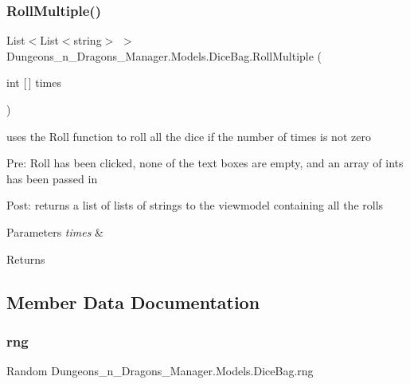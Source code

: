 \subsubsection{\texorpdfstring{Roll\+Multiple()}{RollMultiple()}}
{\footnotesize\ttfamily List$<$List$<$string$>$ $>$ Dungeons\+\_\+n\+\_\+\+Dragons\+\_\+\+Manager.\+Models.\+Dice\+Bag.\+Roll\+Multiple (\begin{DoxyParamCaption}\item[{int \mbox{[}$\,$\mbox{]}}]{times }\end{DoxyParamCaption})\hspace{0.3cm}{\ttfamily [inline]}}



uses the Roll function to roll all the dice if the number of times is not zero 

Pre\+: Roll has been clicked, none of the text boxes are empty, and an array of ints has been passed in

Post\+: returns a list of lists of strings to the viewmodel containing all the rolls 


\begin{DoxyParams}{Parameters}
{\em times} & \\
\hline
\end{DoxyParams}
\begin{DoxyReturn}{Returns}

\end{DoxyReturn}


\subsection{Member Data Documentation}
\mbox{\label{class_dungeons__n___dragons___manager_1_1_models_1_1_dice_bag_a5932c409a8287ea61641f20048b6c2d1}} 
\subsubsection{\texorpdfstring{rng}{rng}}
{\footnotesize\ttfamily Random Dungeons\+\_\+n\+\_\+\+Dragons\+\_\+\+Manager.\+Models.\+Dice\+Bag.\+rng\hspace{0.3cm}{\ttfamily [private]}}



